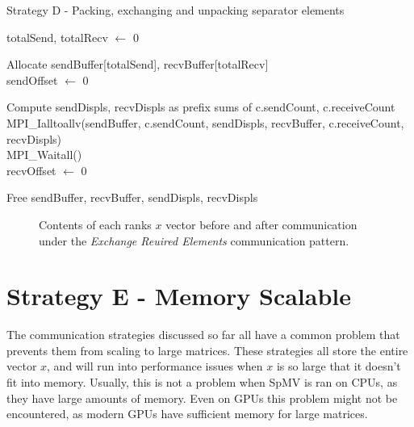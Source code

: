 \begin{algorithm}[H]
    \label{alg:reqsepexchange}
    \caption{Strategy D - Packing, exchanging and unpacking separator elements}
    \SetAlgoVlined

    totalSend, totalRecv $\gets$ 0\\

    Allocate sendBuffer[totalSend], recvBuffer[totalRecv]\\

    sendOffset $\gets$ 0\\

    Compute sendDispls, recvDispls as prefix sums of c.sendCount, c.receiveCount\\

    MPI\_Ialltoallv(sendBuffer, c.sendCount, sendDispls, recvBuffer, c.receiveCount, recvDispls)\\

    MPI\_Waitall()\\

    recvOffset $\gets$ 0\\

    Free sendBuffer, recvBuffer, sendDispls, recvDispls\\
\end{algorithm}




\begin{figure}[ht]
    \centering
    \caption{Contents of each ranks \(x\) vector before and after communication under the \textit{Exchange Reuired Elements} communication pattern.}
    \label{fig:1dcomm}
\end{figure}


\section{Strategy E - Memory Scalable}
\label{sec:memscal}
The communication strategies discussed so far all have a common problem that prevents them from scaling to large matrices. These strategies all store the entire vector \(x\), and will run into performance issues when \(x\) is so large that it doesn't fit into memory. Usually, this is not a problem when SpMV is ran on CPUs, as they have large amounts of memory. Even on GPUs this problem might not be encountered, as modern GPUs have sufficient memory for large matrices.
\medskip


